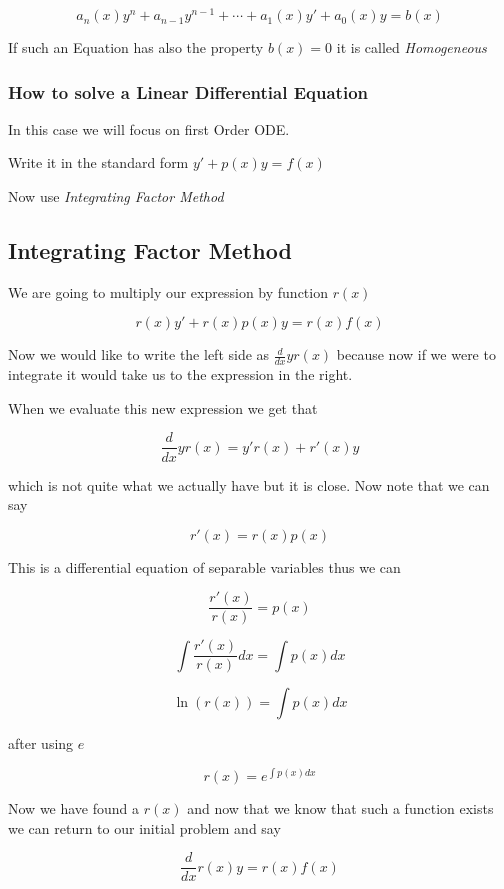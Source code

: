 \[a_n(x)y^n + a_{n - 1}y^{n -1} + \cdots + a_1(x)y' + a_0(x)y = b(x)\]

If such an Equation has also the property \(b(x) = 0\) it is called \emph{Homogeneous}

\subsubsection{How to solve a Linear Differential Equation}

In this case we will focus on first Order ODE\@.
\vspace{\baselineskip}

Write it in the standard form \(y' + p(x)y = f(x)\)
\vspace{\baselineskip}

Now use \emph{Integrating Factor Method}

\subsection{Integrating Factor Method}

We are going to multiply our expression by function \(r(x)\) 

\[r(x)y' + r(x)p(x)y = r(x)f(x)\]

Now we would like to write the left side as \(\frac{d}{dx} y r(x)\) because now if we
were to integrate it would take us to the expression in the right.
\vspace{\baselineskip}

When we evaluate this new expression we get that

\[\frac{d}{dx} y r(x) = y'r(x) + r'(x)y\]

which is not quite what we actually have but it is close. Now note that we can say

\[r'(x) = r(x)p(x)\]

This is a differential equation of separable variables thus we can

\[\frac{r'(x)}{r(x)} = p(x)\]

\[\int \frac{r'(x)}{r(x)}dx = \int p(x)dx\]

\[ \ln(r(x)) = \int p(x) dx\]

after using \(e\)

\[ r(x) = e^{\int p(x) dx}\]

Now we have found a \(r(x)\) and now that we know that such a function exists we can return 
to our initial problem and say

\[\frac{d}{dx}r(x)y = r(x)f(x)\]

